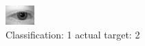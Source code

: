 \begin{figure}[h!]
\begin{center}
\includegraphics[width=0.60\columnwidth]{figures/ID387_class_1_target_2.png}
\end{center}
\caption{ Classification: 1 actual target: 2}
\label{fig:ID387_class_1_target_2}
\end{figure}
